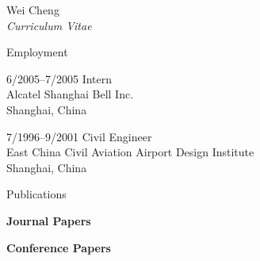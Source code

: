 \documentclass[10pt]{article}
\begin{document}
\begin{cv}{Wei Cheng\\{\large \itshape Curriculum Vitae}}
\pagebreak

\begin{cvlist}{Employment}
	\item[6/2005--7/2005] Intern\\ 
	Alcatel Shanghai Bell Inc.\\
	Shanghai, China
    \item[7/1996--9/2001] Civil Engineer\\
    East China Civil Aviation Airport Design Institute\\
    Shanghai, China 
\end{cvlist}



\setlength{\oldcvlabelwidth}{\cvlabelwidth}
\setlength{\cvlabelwidth}{1em}
\renewcommand*{\bibindent}{1.5em}
\renewcommand*{\biblabelsep}{1.5em}

\begin{cvlist}{Publications}
    \item \textbf{Journal Papers}
	\item \textbf{Conference Papers} 
\end{cvlist}
\setlength{\cvlabelwidth}{\oldcvlabelwidth}


\end{cv}
\end{document}
